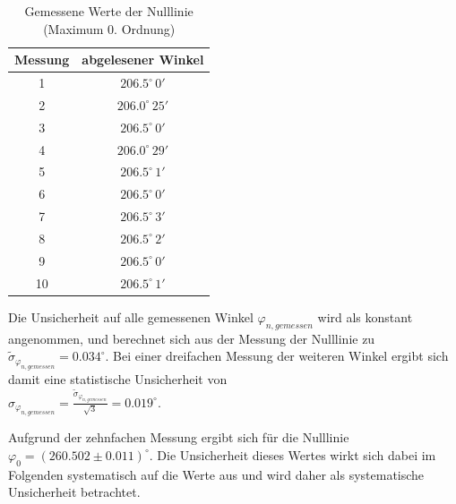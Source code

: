 \documentclass[a4paper, 11pt]{article}
\begin{document}
\begin{table}[H]
	\large
	\centering
	\begin{tabular}{|c|c|}
		\hline
		Messung &	abgelesener Winkel \\
		\hline
		1	&	$206.5^{\circ} \, 0'$ \\
		\hline
		2	&	$206.0^{\circ} \, 25'$ \\
		\hline
		3	&	$206.5^{\circ} \, 0'$ \\
		\hline		
		4	&	$206.0^{\circ} \, 29'$ \\
		\hline
		5	&	$206.5^{\circ} \, 1'$ \\
		\hline
		6	&	$206.5^{\circ} \, 0'$ \\
		\hline
		7	&	$206.5^{\circ} \, 3'$ \\
		\hline
		8	&	$206.5^{\circ} \, 2'$ \\
		\hline
		9	&	$206.5^{\circ} \, 0'$ \\
		\hline
		10	&	$206.5^{\circ} \, 1'$ \\
		\hline
	\end{tabular}
	\caption{Gemessene Werte der Nulllinie (Maximum 0. Ordnung)}
	\label{table:Nulllinie}
\end{table}
Die Unsicherheit auf alle gemessenen Winkel $\varphi_{n, gemessen}$ wird als konstant angenommen, und berechnet sich aus der Messung der Nulllinie zu $\tilde{\sigma}_{\varphi_{n, gemessen}} = 0.034^{\circ}$. Bei einer dreifachen Messung der weiteren Winkel ergibt sich damit eine statistische Unsicherheit von \\
$\sigma_{\varphi_{n, gemessen}} = \frac{\tilde{\sigma}_{\varphi_{n, gemessen}}}{\sqrt{3}} = 0.019^{\circ}$.

Aufgrund der zehnfachen Messung ergibt sich für die Nulllinie $\varphi_0 = (260.502 \pm 0.011)^{\circ}$. Die Unsicherheit dieses Wertes wirkt sich dabei im Folgenden systematisch auf die Werte aus und wird daher als systematische Unsicherheit betrachtet.
\end{document}
